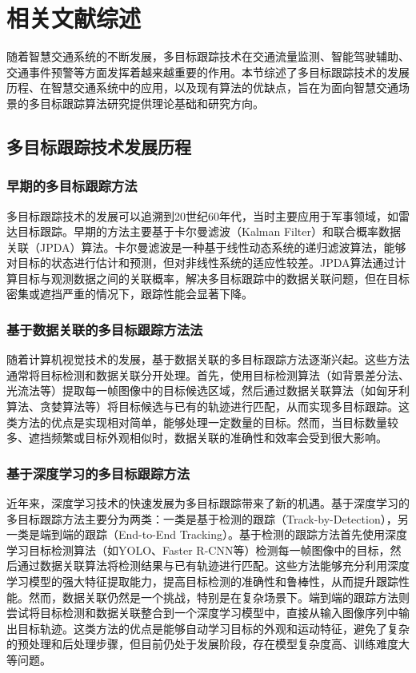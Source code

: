 \chapter{相关文献综述}

随着智慧交通系统的不断发展，多目标跟踪技术在交通流量监测、智能驾驶辅助、交通事件预警等方面发挥着越来越重要的作用。本节综述了多目标跟踪技术的发展历程、在智慧交通系统中的应用，以及现有算法的优缺点，旨在为面向智慧交通场景的多目标跟踪算法研究提供理论基础和研究方向\cite{Geiger2012CVPR}。

\section{多目标跟踪技术发展历程}

\subsection{早期的多目标跟踪方法}

多目标跟踪技术的发展可以追溯到20世纪60年代，当时主要应用于军事领域，如雷达目标跟踪。早期的方法主要基于卡尔曼滤波（Kalman Filter）和联合概率数据关联（JPDA）算法。卡尔曼滤波是一种基于线性动态系统的递归滤波算法，能够对目标的状态进行估计和预测，但对非线性系统的适应性较差。JPDA算法通过计算目标与观测数据之间的关联概率，解决多目标跟踪中的数据关联问题，但在目标密集或遮挡严重的情况下，跟踪性能会显著下降\cite{milan2016mot16}。

\subsection{基于数据关联的多目标跟踪方法法}

随着计算机视觉技术的发展，基于数据关联的多目标跟踪方法逐渐兴起。这些方法通常将目标检测和数据关联分开处理。首先，使用目标检测算法（如背景差分法、光流法等）提取每一帧图像中的目标候选区域，然后通过数据关联算法（如匈牙利算法、贪婪算法等）将目标候选与已有的轨迹进行匹配，从而实现多目标跟踪。这类方法的优点是实现相对简单，能够处理一定数量的目标。然而，当目标数量较多、遮挡频繁或目标外观相似时，数据关联的准确性和效率会受到很大影响\cite{马昌庆 2021 面向大场景监控视频的行人多目标跟踪算法研究}。

\subsection{基于深度学习的多目标跟踪方法}

近年来，深度学习技术的快速发展为多目标跟踪带来了新的机遇。基于深度学习的多目标跟踪方法主要分为两类：一类是基于检测的跟踪（Track-by-Detection），另一类是端到端的跟踪（End-to-End Tracking）。\cite{黄晓舸 2024 有向无环图区块链辅助深度强化学习的智能驾驶策略优化算法}基于检测的跟踪方法首先使用深度学习目标检测算法（如YOLO、Faster R-CNN等）检测每一帧图像中的目标，然后通过数据关联算法将检测结果与已有轨迹进行匹配。这些方法能够充分利用深度学习模型的强大特征提取能力，提高目标检测的准确性和鲁棒性，从而提升跟踪性能。然而，数据关联仍然是一个挑战，特别是在复杂场景下。端到端的跟踪方法则尝试将目标检测和数据关联整合到一个深度学习模型中，直接从输入图像序列中输出目标轨迹。这类方法的优点是能够自动学习目标的外观和运动特征，避免了复杂的预处理和后处理步骤，但目前仍处于发展阶段，存在模型复杂度高、训练难度大等问题\cite{胡玉杰 2021 面向复杂场景的多目标跟踪算法研究}。

